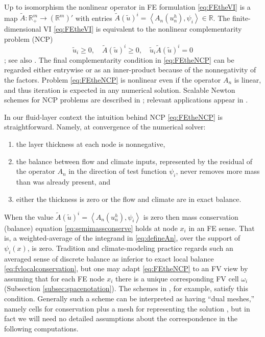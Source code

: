 \documentclass[final,onefignum]{siamart190516}
\newcommand{\ip}[2]{\ensuremath{\left<#1,#2\right>}}
\newcommand\RR{\mathbb{R}}
\begin{document}
Up to isomorphism the nonlinear operator in FE formulation \eqref{eq:FEtheVI} is a map $\tilde A:\RR_+^m \to (\RR^m)'$ with entries $\tilde A(\tilde u)^i = \ip{A_n(u_n^h)}{\psi_i} \in \RR$.  The finite-dimensional VI \eqref{eq:FEtheVI} is equivalent to the nonlinear complementarity problem (NCP)
\begin{equation}
\tilde u_i \ge 0, \quad \tilde A(\tilde u)^i \ge 0, \quad \tilde u_i \tilde A(\tilde u)^i = 0 \label{eq:FEtheNCP}
\end{equation}
\cite[Theorem I.5.5]{KinderlehrerStampacchia1980}; see also \cite{FacchineiPang2003}.  The final complementarity condition in \eqref{eq:FEtheNCP} can be regarded either entrywise or as an inner-product because of the nonnegativity of the factors.  Problem \eqref{eq:FEtheNCP} is nonlinear even if the operator $A_n$ is linear, and thus iteration is expected in any numerical solution.  Scalable Newton schemes for NCP problems are described in \cite{BensonMunson2006}; relevant applications appear in \cite{Brinkerhoffetal2017,Bueler2016}.

In our fluid-layer context the intuition behind NCP \eqref{eq:FEtheNCP} is straightforward.  Namely, at convergence of the numerical solver:
\renewcommand{\labelenumi}{(\roman{enumi})}
\begin{enumerate}
\item the layer thickness at each node is nonnegative,
\item the balance between flow and climate inputs, represented by the residual of the operator $A_n$ in the direction of test function $\psi_i$, never removes more mass than was already present, and
\item either the thickness is zero or the flow and climate are in exact balance.
\end{enumerate}

\smallskip
When the value $\tilde A(\tilde u)^i = \ip{A_n(u_n^h)}{\psi_i}$ is zero then mass conservation (balance) equation \eqref{eq:semimassconserve} holds at node $x_i$ in an FE sense.  That is, a weighted-average of the integrand in \eqref{eq:defineAn}, over the support of $\psi_i(x)$, is zero.  Tradition and climate-modeling practice regards such an averaged sense of discrete balance as inferior to exact local balance \eqref{eq:fvlocalconservation}, but one may adapt \eqref{eq:FEtheNCP} to an FV view by assuming that for each FE node $x_i$ there is a unique corresponding FV cell $\omega_i$ (Subsection \ref{subsec:spacenotation}).  The schemes in \cite{Bueler2016,EwingLinLin2002,Ringleretal2013}, for example, satisfy this condition.  Generally such a scheme can be interpreted as having ``dual meshes,'' namely cells for conservation plus a mesh for representing the solution \cite{Ringleretal2013}, but in fact we will need no detailed assumptions about the correspondence in the following computations.
\end{document}
